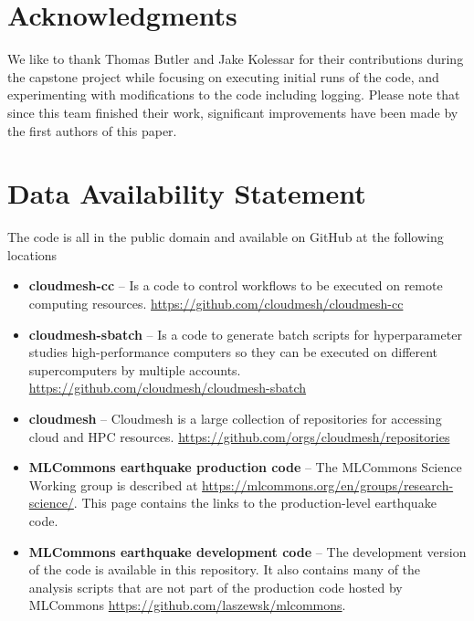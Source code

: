 \documentclass[utf8]{FrontiersinVancouver} %
\begin{document}
\section*{Acknowledgments}

We like to thank Thomas Butler and Jake Kolessar for their contributions during the capstone project while focusing on executing initial runs of the code, and experimenting with modifications to the code including logging. Please note that since this team finished their work, significant improvements have been made by the first authors of this paper.


\section*{Data Availability Statement}

The code is all in the public domain and available on GitHub at the following locations

\begin{itemize}

\item {\bf cloudmesh-cc} -- Is a code to control workflows to be executed on
  remote computing
  resources. \url{https://github.com/cloudmesh/cloudmesh-cc}

\item {\bf cloudmesh-sbatch} -- Is a code to generate batch scripts for
  hyperparameter studies high-performance computers so they can be
  executed on different supercomputers by multiple
  accounts. \url{https://github.com/cloudmesh/cloudmesh-sbatch}

\item {\bf cloudmesh} -- Cloudmesh is a large collection of repositories for
  accessing cloud and HPC
  resources. \url{https://github.com/orgs/cloudmesh/repositories}

\item {\bf MLCommons earthquake production code} -- The MLCommons Science
  Working group is described at
  \url{https://mlcommons.org/en/groups/research-science/}. This page
  contains the links to the production-level earthquake code.

\item {\bf MLCommons earthquake development code} -- The development version of
  the code is available in this repository. It also contains many of
  the analysis scripts that are not part of the production code
  hosted by MLCommons \url{https://github.com/laszewsk/mlcommons}.

\end{itemize}


% 



\end{document}
